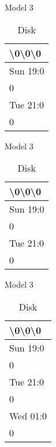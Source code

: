 \documentclass{beamer}
\begin{document}
\begin{frame}{Model 3}
  \begin{figure}
    \def\svgwidth{0.7\columnwidth}
    
  \end{figure}
  \begin{table}[]
    \centering
    \caption{Disk}
    \label{my-label}
    \begin{tabular}{|l|}
      \hline
      \textbackslash0\textbackslash0\textbackslash0   \\ \hline
      Sun 19:0 \\ \hline
      0        \\ \hline
      Tue 21:0 \\ \hline
      0        \\ \hline
    \end{tabular}
  \end{table}
\end{frame}

\begin{frame}{Model 3}
  \begin{figure}
    \def\svgwidth{0.7\columnwidth}
    
  \end{figure}
  \begin{table}[]
    \centering
    \caption{Disk}
    \label{my-label}
    \begin{tabular}{|l|}
      \hline
      \textbackslash0\textbackslash0\textbackslash0   \\ \hline
      Sun 19:0 \\ \hline
      0        \\ \hline
      Tue 21:0 \\ \hline
      0        \\ \hline
    \end{tabular}
  \end{table}
\end{frame}

\begin{frame}{Model 3}
  \begin{figure}
    \def\svgwidth{0.7\columnwidth}
    
  \end{figure}
  \begin{table}[]
    \centering
    \caption{Disk}
    \label{my-label}
    \begin{tabular}{|l|}
      \hline
      \textbackslash0\textbackslash0\textbackslash0   \\ \hline
      Sun 19:0 \\ \hline
      0        \\ \hline
      Tue 21:0 \\ \hline
      0        \\ \hline
      Wed 01:0 \\ \hline
      0        \\ \hline
    \end{tabular}
  \end{table}
\end{frame}
\end{document}
